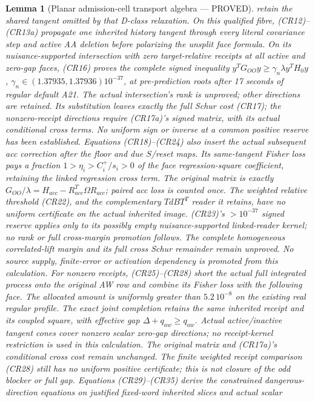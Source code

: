 \documentclass[journal]{IEEEtran}
\newtheorem{lemma}{Lemma}\newtheorem{theorem}{Theorem}\newtheorem{proposition}{Proposition}\newtheorem{remark}{Remark}\newtheorem{corollary}{Corollary}
\begin{document}
\begin{lemma}[Planar admission-cell transport algebra --- PROVED]
retain the shared tangent omitted by that D-class relaxation.
On this qualified fibre, (CR12)--(CR13a) propagate one inherited
history tangent through every literal covariance step and active AA deletion
before polarizing the unsplit face formula. On its nuisance-supported
intersection with zero target-relative receipts at all active and zero-gap
faces, (CR16) proves the
complete signed inequality
$y^TG_{OO}y\ge\gamma_n\lambda y^TH_0y$,
$\gamma_n\in(1.37935,1.37936)10^{-37}$, at pre-prediction roots after
17 seconds of regular default A21. The actual intersection's rank is
unproved; other directions are retained. Its substitution leaves exactly
the full Schur cost (CR17); the nonzero-receipt directions require (CR17a)'s
signed matrix, with its actual conditional cross terms. No uniform sign
or inverse at a common positive reserve has been established.
Equations (CR18)--(CR24) also insert the actual subsequent acc correction
after the floor and due $S$/reset maps. Its same-tangent Fisher loss pays
a fraction $1>\eta_i>C_i^+/s_i>0$ of the face regression-square coefficient,
retaining the linked regression cross term. The original matrix is exactly
$G_{OO}/\lambda=H_{acc}-R_{acc}^T\Omega R_{acc}$; paired acc loss is counted
once. The weighted relative threshold (CR22), and the complementary
$T dB T^T$ reader it retains, have no uniform certificate on the actual
inherited image. (CR23)'s $>10^{-37}$ signed reserve applies only to its
possibly empty nuisance-supported linked-reader kernel; no rank or full
cross-margin promotion follows.
The complete homogeneous correlated-lift margin and its full cross Schur
remainder remain unproved. No source supply, finite-error or activation
dependency is promoted from this calculation.
For nonzero receipts, (CR25)--(CR28) short the actual full integrated
process onto the original AW row and combine its Fisher loss with the
following face. The allocated amount is uniformly greater than
$5.2\,10^{-8}$ on the existing real regular profile. The exact joint
completion retains the same inherited receipt and its coupled square,
with effective gap $\Delta+q_{aw}\ge q_{aw}$.
Actual active/inactive tangent cones cover nonzero scalar zero-gap
directions; no receipt-kernel restriction is used in this calculation.
The original matrix and (CR17a)'s conditional cross cost remain unchanged.
The finite weighted receipt comparison (CR28) still has no uniform
positive certificate; this is not closure of the odd blocker or full gap.
Equations (CR29)--(CR35) derive the constrained dangerous-direction
equations on justified fixed-word inherited slices and actual scalar

\end{lemma}
\end{document}
